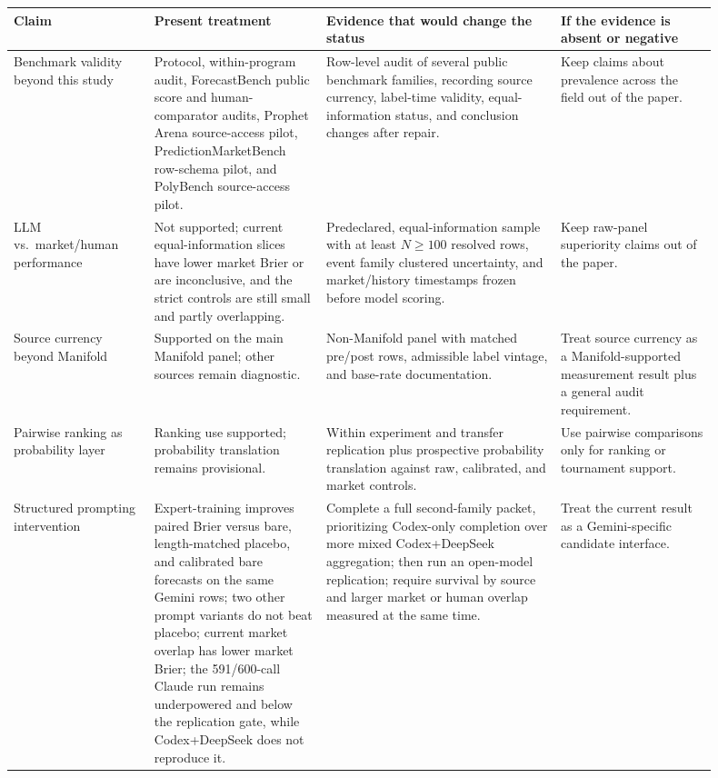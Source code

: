 \documentclass[11pt]{article}
\begin{document}
\begin{table}[p]
\centering
\begingroup
\setlength{\tabcolsep}{2.5pt}
\renewcommand{\arraystretch}{0.86}
\tiny
\begin{tabular}{@{}L{0.18\linewidth} L{0.22\linewidth} L{0.30\linewidth} L{0.20\linewidth}@{}}
\toprule
Claim & Present treatment & Evidence that would change the status & If the evidence is absent or negative \\
\midrule
Benchmark validity beyond this study & Protocol, within-program audit, ForecastBench public score and human-comparator audits, Prophet Arena source-access pilot, PredictionMarketBench row-schema pilot, and PolyBench source-access pilot. & Row-level audit of several public benchmark families, recording source currency, label-time validity, equal-information status, and conclusion changes after repair. & Keep claims about prevalence across the field out of the paper. \\
LLM vs.\ market/human performance & Not supported; current equal-information slices have lower market Brier or are inconclusive, and the strict controls are still small and partly overlapping. & Predeclared, equal-information sample with at least \(N \ge 100\) resolved rows, event family clustered uncertainty, and market/history timestamps frozen before model scoring. & Keep raw-panel superiority claims out of the paper. \\
Source currency beyond Manifold & Supported on the main Manifold panel; other sources remain diagnostic. & Non-Manifold panel with matched pre/post rows, admissible label vintage, and base-rate documentation. & Treat source currency as a Manifold-supported measurement result plus a general audit requirement. \\
Pairwise ranking as probability layer & Ranking use supported; probability translation remains provisional. & Within experiment and transfer replication plus prospective probability translation against raw, calibrated, and market controls. & Use pairwise comparisons only for ranking or tournament support. \\
Structured prompting intervention & Expert-training improves paired Brier versus bare, length-matched placebo, and calibrated bare forecasts on the same Gemini rows; two other prompt variants do not beat placebo; current market overlap has lower market Brier; the 591/600-call Claude run remains underpowered and below the replication gate, while Codex+DeepSeek does not reproduce it. & Complete a full second-family packet, prioritizing Codex-only completion over more mixed Codex+DeepSeek aggregation; then run an open-model replication; require survival by source and larger market or human overlap measured at the same time. & Treat the current result as a Gemini-specific candidate interface. \\

\end{tabular}
\end{table}
\end{document}
